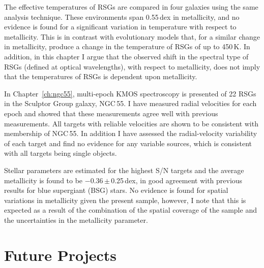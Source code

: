 The effective temperatures of RSGs are compared in four galaxies using the same analysis technique.
These environments span 0.55\,dex in metallicity, and no evidence is found for a significant variation in temperature with respect to metallicity.
This is in contrast with evolutionary models that, for a  similar change in metallicity, produce a change in the temperature of RSGs of up to 450\,K.
In addition, in this chapter I argue that the observed shift in the spectral type of RSGs (defined at optical wavelengths), with respect to metallicity, does not imply that the temperatures of RSGs is dependent upon metallicity.


In Chapter~\ref{ch:ngc55}, multi-epoch KMOS spectroscopy is presented of 22 RSGs in the Sculptor Group galaxy, NGC\,55.
I have measured radial velocities for each epoch and showed that these measurements agree well with previous measurements.
All targets with reliable velocities are shown to be consistent with membership of NGC\,55.
In addition I have assessed the radial-velocity variability of each target and find no evidence for any variable sources, which is consistent with all targets being single objects.

Stellar parameters are estimated for the highest S/N targets and the average metallicity is found to be $-$0.36\,$\pm$\,0.25\,dex, in good agreement with previous results for blue supergiant (BSG) stars.
No evidence is found for spatial variations in metallicity given the present sample, however, I note that this is expected as a result of the combination of the spatial coverage of the sample and the uncertainties in the metallicity parameter.


\section{Future Projects} %
\label{sec:future_projects}

